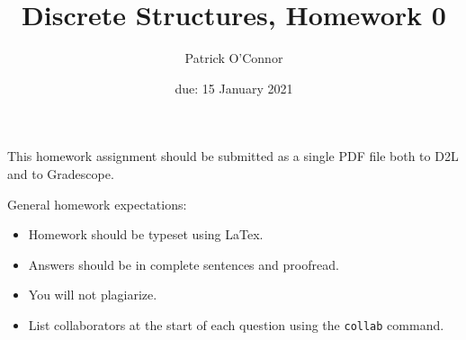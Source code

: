 \documentclass{article}
\title{Discrete Structures, Homework 0}
\author{Patrick O'Connor}
\date{due: 15 January 2021}
\begin{document}
\maketitle

This homework assignment should be
submitted as a single PDF file both to D2L and to Gradescope.

General homework expectations:
\begin{itemize}
    \item Homework should be typeset using LaTex.
    \item Answers should be in complete sentences and proofread.
    \item You will not plagiarize.
    \item List collaborators at the start of each question using the
        \texttt{collab} command.
\end{itemize}

\end{document}
